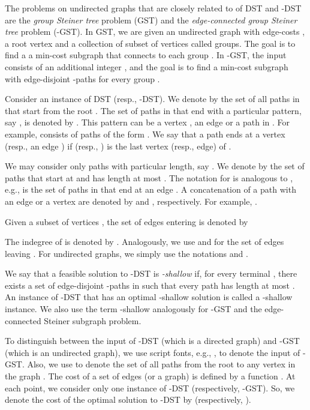 \documentclass[11pt]{article}
\theoremstyle{definition}
\theoremstyle{remark}
\begin{document}
The problems on undirected graphs that are closely related to 
of DST and -DST are the 
{\em group Steiner tree} problem (GST) and 
the {\em  edge-connected group Steiner tree} problem (-GST).
In GST, we are given an undirected graph  with edge-costs
, a root vertex  and a collection of subset of
vertices  called groups. The goal is to find a
a min-cost subgraph  that connects  to each group
. In -GST, the input consists of an additional integer ,
and the goal is to find a min-cost subgraph  with  edge-disjoint
-paths for every group .

Consider an instance of DST (resp., -DST).
We denote by  the set of all paths in  that start from the root .
The set of paths in  that end with a particular pattern, say
, is denoted by . This pattern 
can be a vertex , an edge  or a path  in
. For example,  consists of paths  of the form
. We say that a path  ends at a vertex 
(resp., an edge ) if  (resp., ) is 
the last vertex (resp., edge) of .

We may consider only paths with particular length, say .
We denote by  the set of paths that start at  and has length
at most . The notation for  is analogous to , e.g.,
 is the set of paths in  that end at an
edge .
A concatenation of a path  with an edge  or a vertex 
are denoted by  and , respectively.
For example, .

Given a subset of vertices , 
the set of edges entering  is denoted by 

The indegree of  is denoted by .
Analogously, we use  and  for
the set of edges leaving .
For undirected graphs, we simply use the notations  and .

We say that a feasible solution  to -DST is {\em -shallow}
if, for every terminal , there exists a set of 
 edge-disjoint -paths in  such that every path has length at most
.
An instance of -DST that has an optimal -shallow solution
is called a -shallow instance.
We also use the term -shallow analogously for -GST
and the  edge-connected Steiner subgraph problem.




To distinguish between the input of -DST (which is a directed graph)
and -GST (which is an undirected graph), we use script fonts, 
e.g., , to denote the input of -GST.
Also, we use  to denote the set of all paths from the root 
to any vertex  in the graph . 
The cost of a set of edges  (or a graph) is defined by a function 
. 
At each point, we consider only one instance of -DST 
(respectively, -GST).
So, we denote the cost of the optimal solution to -DST by 
 (respectively, ).
\end{document}
